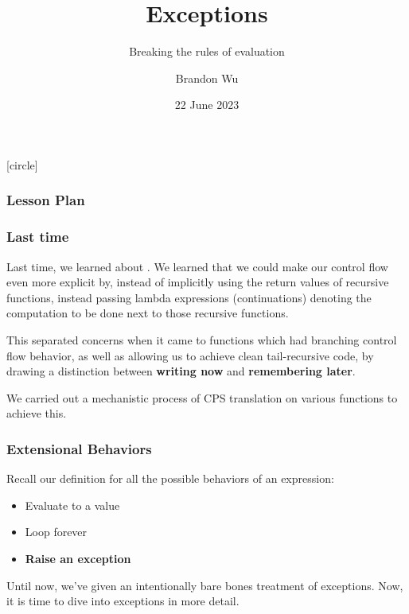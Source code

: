 \documentclass[aspectratio=169]{beamer}
\title{Exceptions} %
\subtitle{Breaking the rules of evaluation} %
\date{22 June 2023} %
\author{Brandon Wu} %
\newif\ifcolorlambda
\begin{document}
\ifweb
    \renewcommand{\pause}{}
\fi

[circle]

{
\begin{frame}[plain]
    \colorlambdatrue
    \titlepage
\end{frame}
}

\begin{frame}[fragile]
  \frametitle{Lesson Plan}

  \tableofcontents
\end{frame}

\begin{frame}[fragile]
  \frametitle{Last time}

  Last time, we learned about . We learned that
  we could make our control flow even more explicit by, instead of implicitly
  using the return values of recursive functions, instead passing lambda expressions
  (continuations) denoting the computation to be done next to those recursive functions.

  \vspace{\fill}

  This separated concerns when it came to functions which had branching control
  flow behavior, as well as allowing us to achieve clean tail-recursive code,
  by drawing a distinction between \textbf{writing now} and \textbf{remembering later}.

  \vspace{\fill}

  We carried out a mechanistic process of CPS translation on various functions to
  achieve this.
\end{frame}


\begin{frame}[fragile]
  \frametitle{Extensional Behaviors}

  Recall our definition for all the possible behaviors of an expression:
  \begin{itemize}
    \item Evaluate to a value
    \item Loop forever
    \item \textbf{Raise an exception}
  \end{itemize}

  \vspace{\fill}

  Until now, we've given an intentionally bare bones treatment of 
  exceptions. Now, it is time to dive into exceptions in more detail. 
\end{frame}
\end{document}
